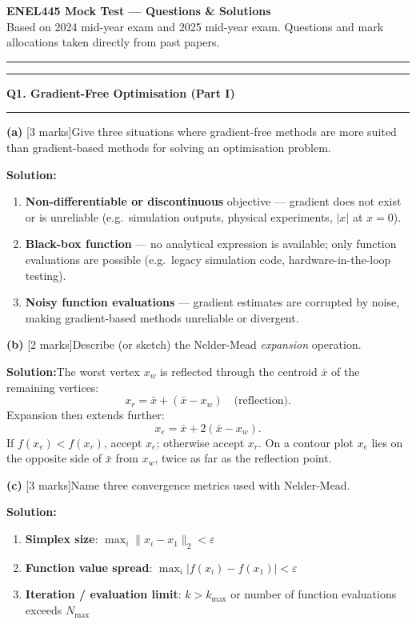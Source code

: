 \documentclass[10pt,a4paper]{article}
\newcommand{\sectitle}[1]{%
  \vspace{8pt}\noindent\rule{\linewidth}{0.8pt}\par\vspace{2pt}%
  {\large\textbf{#1}}\par\vspace{2pt}\rule{\linewidth}{0.4pt}\vspace{4pt}}
\newcommand{\Sol}{\par\vspace{4pt}\noindent\textbf{Solution:}\enspace}
\begin{document}
\begin{center}
  {\large\textbf{ENEL445 Mock Test --- Questions \& Solutions}}\\[2pt]
  {\small Based on 2024 mid-year exam and 2025 mid-year exam. Questions and mark
  allocations taken directly from past papers.}
\end{center}

\noindent\rule{\linewidth}{0.4pt}

\sectitle{Q1. Gradient-Free Optimisation (Part I)}

\noindent\textbf{(a)} [3 marks]\quad Give three situations where gradient-free methods are more suited than gradient-based methods for solving an optimisation problem.

\Sol
\begin{enumerate}[noitemsep, topsep=2pt]
  \item \textbf{Non-differentiable or discontinuous} objective --- gradient does
        not exist or is unreliable (e.g.\ simulation outputs, physical
        experiments, $|x|$ at $x=0$).
  \item \textbf{Black-box function} --- no analytical expression is available;
        only function evaluations are possible (e.g.\ legacy simulation code,
        hardware-in-the-loop testing).
  \item \textbf{Noisy function evaluations} --- gradient estimates are corrupted
        by noise, making gradient-based methods unreliable or divergent.
\end{enumerate}

\vspace{4pt}
\noindent\textbf{(b)} [2 marks]\quad Describe (or sketch) the Nelder-Mead
\textit{expansion} operation.

\Sol The worst vertex $x_w$ is reflected through the centroid $\bar{x}$ of the
remaining vertices:
\[
  x_r = \bar{x} + (\bar{x} - x_w) \quad\text{(reflection)}.
\]
Expansion then extends further:
\[
  x_e = \bar{x} + 2(\bar{x} - x_w).
\]
If $f(x_e) < f(x_r)$, accept $x_e$; otherwise accept $x_r$. On a contour plot
$x_e$ lies on the opposite side of $\bar{x}$ from $x_w$, twice as far as the
reflection point.

\vspace{4pt}
\noindent\textbf{(c)} [3 marks]\quad Name three convergence metrics used with
Nelder-Mead.

\Sol
\begin{enumerate}[noitemsep, topsep=2pt]
  \item \textbf{Simplex size}: $\max_i \|x_i - x_1\|_2 < \varepsilon$
  \item \textbf{Function value spread}: $\max_i |f(x_i) - f(x_1)| < \varepsilon$
  \item \textbf{Iteration / evaluation limit}: $k > k_{\max}$ or number of
        function evaluations exceeds $N_{\max}$
\end{enumerate}
\end{document}
